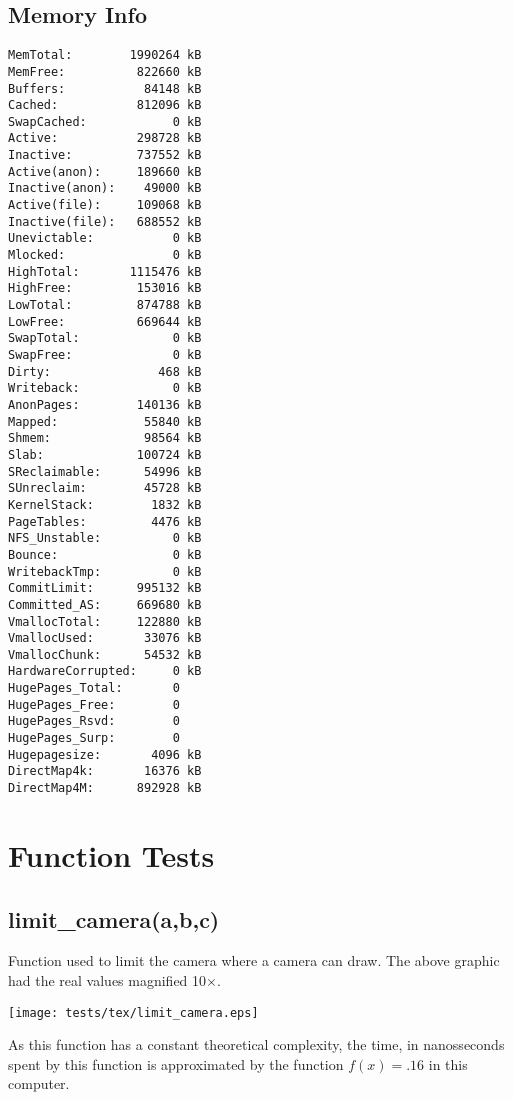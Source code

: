 \documentclass{article}
\begin{document}
\subsection{Memory Info}
\begin{verbatim}
MemTotal:        1990264 kB
MemFree:          822660 kB
Buffers:           84148 kB
Cached:           812096 kB
SwapCached:            0 kB
Active:           298728 kB
Inactive:         737552 kB
Active(anon):     189660 kB
Inactive(anon):    49000 kB
Active(file):     109068 kB
Inactive(file):   688552 kB
Unevictable:           0 kB
Mlocked:               0 kB
HighTotal:       1115476 kB
HighFree:         153016 kB
LowTotal:         874788 kB
LowFree:          669644 kB
SwapTotal:             0 kB
SwapFree:              0 kB
Dirty:               468 kB
Writeback:             0 kB
AnonPages:        140136 kB
Mapped:            55840 kB
Shmem:             98564 kB
Slab:             100724 kB
SReclaimable:      54996 kB
SUnreclaim:        45728 kB
KernelStack:        1832 kB
PageTables:         4476 kB
NFS_Unstable:          0 kB
Bounce:                0 kB
WritebackTmp:          0 kB
CommitLimit:      995132 kB
Committed_AS:     669680 kB
VmallocTotal:     122880 kB
VmallocUsed:       33076 kB
VmallocChunk:      54532 kB
HardwareCorrupted:     0 kB
HugePages_Total:       0
HugePages_Free:        0
HugePages_Rsvd:        0
HugePages_Surp:        0
Hugepagesize:       4096 kB
DirectMap4k:       16376 kB
DirectMap4M:      892928 kB
\end{verbatim}
\section{Function Tests}
\subsection{limit\_camera(a,b,c)}
Function used to limit the camera where a camera 
can draw. The above graphic had the real values
magnified 10$\times$.

\texttt{[image: tests/tex/limit\_camera.eps]}

As this function has a constant
theoretical complexity, the time, in nanosseconds
spent by this function is 
approximated by the function $f(x)=.16$
in this computer.
\end{document}
